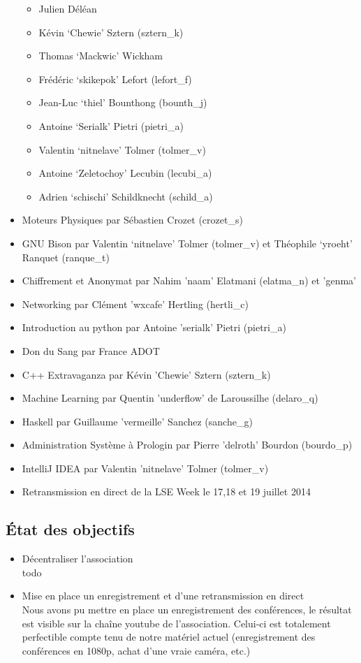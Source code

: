 \documentclass[12pt]{report}
\begin{document}
\begin{itemize}
\begin{itemize}
        \item Julien Déléan
        \item Kévin `Chewie' Sztern (sztern\_k)
        \item Thomas `Mackwic' Wickham
        \item Frédéric `skikepok' Lefort (lefort\_f)
        \item Jean-Luc `thiel' Bounthong (bounth\_j)
        \item Antoine `Serialk' Pietri (pietri\_a)
        \item Valentin `nitnelave' Tolmer (tolmer\_v)
        \item Antoine `Zeletochoy' Lecubin (lecubi\_a)
        \item Adrien `schischi' Schildknecht (schild\_a)
      \end{itemize}
    \item Moteurs Physiques par Sébastien Crozet (crozet\_s)
    \item GNU Bison par Valentin `nitnelave' Tolmer (tolmer\_v) et Théophile `yroeht' Ranquet (ranque\_t)
    \item Chiffrement et Anonymat par Nahim 'naam' Elatmani (elatma\_n) et 'genma'
    \item Networking par Clément 'wxcafe' Hertling (hertli\_c)
    \item Introduction au python par Antoine 'serialk' Pietri (pietri\_a)
    \item Don du Sang par France ADOT
    \item C++ Extravaganza par Kévin 'Chewie' Sztern (sztern\_k)
    \item Machine Learning par Quentin 'underflow' de Laroussilhe (delaro\_q)
    \item Haskell par Guillaume 'vermeille' Sanchez (sanche\_g)
    \item Administration Système à Prologin par Pierre 'delroth' Bourdon
            (bourdo\_p)
    \item IntelliJ IDEA par Valentin 'nitnelave' Tolmer (tolmer\_v)
    \item Retransmission en direct de la LSE Week le 17,18 et 19 juillet 2014
  \end{itemize}
    \subsection{État des objectifs}
    \begin{itemize}
            \item Décentraliser l'association \\
                    todo
            \item Mise en place un enregistrement et d'une retransmission en
                   direct\\
                   Nous avons pu mettre en place un enregistrement des
                   conférences, le résultat est visible sur la chaîne youtube
                   de l'association.
                   Celui-ci est totalement perfectible compte tenu de notre
                   matériel actuel (enregistrement des conférences en 1080p,
                   achat d'une vraie caméra, etc.)
    \end{itemize}
\end{document}
